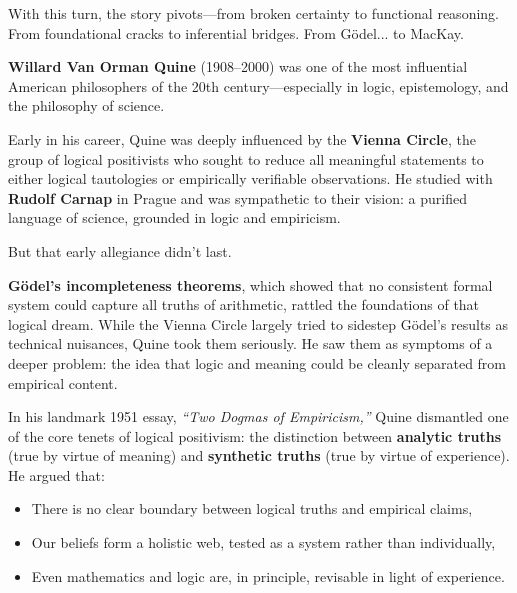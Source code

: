 \noindent
With this turn, the story pivots—from broken certainty to functional reasoning. From foundational cracks to inferential bridges. From Gödel... to MacKay.

\begin{tcolorbox}[colback=gray!5!white, colframe=black!75!white, title={Historical Sidebar: W.V.O. Quine and the Death of the Analytic-Synthetic Divide}]

    \textbf{Willard Van Orman Quine} (1908–2000) was one of the most influential American philosophers of the 20th century—especially in logic, epistemology, and the philosophy of science.

    \medskip
    
    Early in his career, Quine was deeply influenced by the \textbf{Vienna Circle}, the group of logical positivists who sought to reduce all meaningful statements to either logical tautologies or empirically verifiable observations. He studied with \textbf{Rudolf Carnap} in Prague and was sympathetic to their vision: a purified language of science, grounded in logic and empiricism.

    \medskip
    
    But that early allegiance didn’t last.
    
    \medskip
    
    \textbf{Gödel’s incompleteness theorems}, which showed that no consistent formal system could capture all truths of arithmetic, rattled the foundations of that logical dream. While the Vienna Circle largely tried to sidestep Gödel’s results as technical nuisances, Quine took them seriously. He saw them as symptoms of a deeper problem: the idea that logic and meaning could be cleanly separated from empirical content.

    \medskip
    
    In his landmark 1951 essay, \textit{“Two Dogmas of Empiricism,”} Quine dismantled one of the core tenets of logical positivism: the distinction between \textbf{analytic truths} (true by virtue of meaning) and \textbf{synthetic truths} (true by virtue of experience). He argued that:

    \medskip
    
    
    \begin{itemize}
        \item There is no clear boundary between logical truths and empirical claims,
        \item Our beliefs form a holistic web, tested as a system rather than individually,
        \item Even mathematics and logic are, in principle, revisable in light of experience.
    \end{itemize}


\end{tcolorbox}
